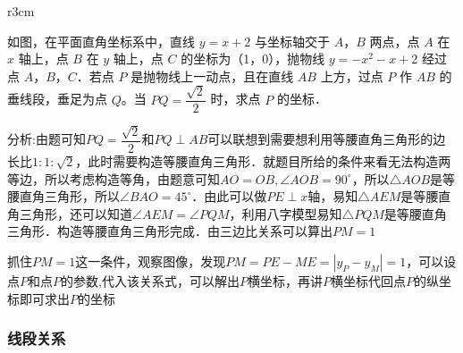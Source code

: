 \begin{minipage}{1\linewidth}
\begin{wrapfigure}{r}{3cm}
\begin{center}
    \end{center}
    
    \end{wrapfigure}

    \begin{example}
        
        如图，在平面直角坐标系中，直线 \( y = x + 2 \) 与坐标轴交于 \( A \)，\( B \) 两点，点 \( A \) 在 \( x \) 轴上，点 \( B \) 在 \( y \) 轴上，点 \( C \) 的坐标为（1，0），抛物线 \( y = -x^2-x + 2 \) 经过点 \( A \)，\( B \)，\( C \)．若点 \( P \) 是抛物线上一动点，且在直线 \( AB \) 上方，过点 \( P \) 作 \( AB \) 的垂线段，垂足为点 \( Q \)。当 \( PQ = \dfrac{\sqrt{2}}{2} \) 时，求点 \( P \) 的坐标．
        
    \end{example}

    \begin{solution}
    分析:由题可知\(PQ=\dfrac{\sqrt{2}}{2}\)和\(PQ\perp AB\)可以联想到需要想利用等腰直角三角形的边长比\(1:1:\sqrt{2}\)，此时需要构造等腰直角三角形．就题目所给的条件来看无法构造两等边，所以考虑构造等角，由题意可知\(AO=OB,\angle AOB=90^\circ\)，所以\(\triangle AOB\)是等腰直角三角形，所以\(\angle BAO=45^\circ\)．由此可以做\(PE\perp x\)轴，易知\(\triangle AEM\)是等腰直角三角形，还可以知道\(\angle AEM=\angle PQM\)，利用八字模型易知\(\triangle PQM\)是等腰直角三角形．构造等腰直角三角形完成．由三边比关系可以算出\(PM=1\)
    \par
    抓住\(PM=1\)这一条件，观察图像，发现\(PM=PE-ME=|y_P-y_M|=1\)，可以设点\(P\)和点\(P\)的参数,代入该关系式，可以解出\(P\)横坐标，再讲\(P\)横坐标代回点\(P\)的纵坐标即可求出\(P\)的坐标
    \end{solution}

\end{minipage}

\subsubsection*{线段关系}

